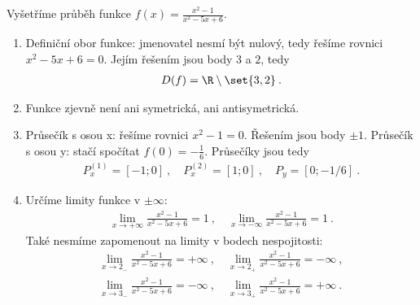 \begin{example}
    Vyšetříme průběh funkce $f(x) = \frac{x^2-1}{x^2-5x+6}$.

\begin{enumerate}
    \item Definiční obor funkce: jmenovatel nesmí být nulový, tedy řešíme rovnici $x^2-5x +6 = 0$. Jejím řešením jsou body $3$ a $2$, tedy \begin{align*}
        D(f) = \R \setminus \set{3,2} \:.
    \end{align*}

    \item Funkce zjevně není ani symetrická, ani antisymetrická.
    \item Průsečík s osou x: řešíme rovnici $x^2-1 = 0$. Řešením jsou body $\pm 1$.
    Průsečík s osou y: stačí spočítat $f(0) = -\frac{1}{6} $.
    Průsečíky jsou tedy \begin{align*}
        P_x^{(1)} = [-1;0] \:, \quad P_x^{(2)} = [1;0] \:, \quad P_y = [0;-1/6] \:.
    \end{align*}
    \item Určíme limity funkce v $\pm \infty$:
    \begin{align*}
        \lim_{x \rightarrow + \infty} \frac{x^2-1}{x^2-5x+6} = 1 \:, \quad \lim_{x \rightarrow - \infty} \frac{x^2-1}{x^2-5x+6} = 1 \:.
    \end{align*}
    Také nesmíme zapomenout na limity v bodech nespojitosti:
    \begin{align*}
        \lim_{x \rightarrow 2_-} \frac{x^2-1}{x^2-5x+6} 
        =+ \infty \:, 
        \quad 
        \lim_{x \rightarrow 2_+} \frac{x^2-1}{x^2-5x+6} 
        = - \infty \:, \\
        \lim_{x \rightarrow 3_-} \frac{x^2-1}{x^2-5x+6} 
        = - \infty \:,
        \quad 
        \lim_{x \rightarrow 3_+} \frac{x^2-1}{x^2-5x+6} 
        = + \infty \:.
    \end{align*}
\end{enumerate}
\end{example}





